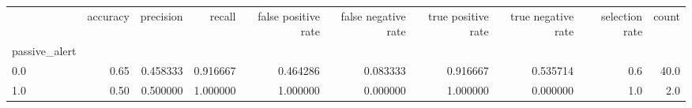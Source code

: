 \begin{tabular}{lrrrrrrrrr}
\toprule
{} &  accuracy &  precision &    recall &  false positive rate &  false negative rate &  true positive rate &  true negative rate &  selection rate &  count \\
passive\_alert &           &            &           &                      &                      &                     &                     &                 &        \\
\midrule
0.0           &      0.65 &   0.458333 &  0.916667 &             0.464286 &             0.083333 &            0.916667 &            0.535714 &             0.6 &   40.0 \\
1.0           &      0.50 &   0.500000 &  1.000000 &             1.000000 &             0.000000 &            1.000000 &            0.000000 &             1.0 &    2.0 \\
\bottomrule
\end{tabular}
